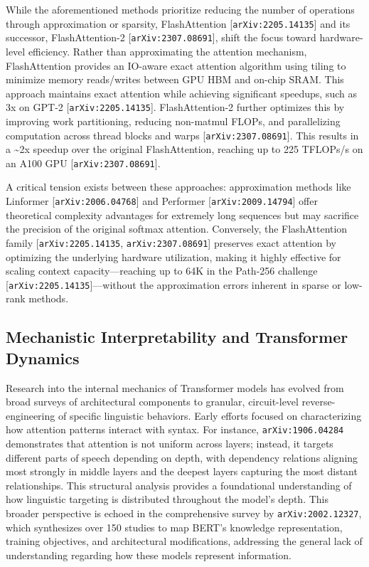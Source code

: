 \documentclass[11pt]{article}
\begin{document}
While the aforementioned methods prioritize reducing the number of operations through approximation or sparsity, FlashAttention [\texttt{arXiv:2205.14135}] and its successor, FlashAttention-2 [\texttt{arXiv:2307.08691}], shift the focus toward hardware-level efficiency. Rather than approximating the attention mechanism, FlashAttention provides an IO-aware exact attention algorithm using tiling to minimize memory reads/writes between GPU HBM and on-chip SRAM. This approach maintains exact attention while achieving significant speedups, such as 3x on GPT-2 [\texttt{arXiv:2205.14135}]. FlashAttention-2 further optimizes this by improving work partitioning, reducing non-matmul FLOPs, and parallelizing computation across thread blocks and warps [\texttt{arXiv:2307.08691}]. This results in a \textasciitilde{}2x speedup over the original FlashAttention, reaching up to 225 TFLOPs/s on an A100 GPU [\texttt{arXiv:2307.08691}].

A critical tension exists between these approaches: approximation methods like Linformer [\texttt{arXiv:2006.04768}] and Performer [\texttt{arXiv:2009.14794}] offer theoretical complexity advantages for extremely long sequences but may sacrifice the precision of the original softmax attention. Conversely, the FlashAttention family [\texttt{arXiv:2205.14135}, \texttt{arXiv:2307.08691}] preserves exact attention by optimizing the underlying hardware utilization, making it highly effective for scaling context capacity—reaching up to 64K in the Path-256 challenge [\texttt{arXiv:2205.14135}]—without the approximation errors inherent in sparse or low-rank methods.

\subsection{Mechanistic Interpretability and Transformer Dynamics}

Research into the internal mechanics of Transformer models has evolved from broad surveys of architectural components to granular, circuit-level reverse-engineering of specific linguistic behaviors. Early efforts focused on characterizing how attention patterns interact with syntax. For instance, \texttt{arXiv:1906.04284} demonstrates that attention is not uniform across layers; instead, it targets different parts of speech depending on depth, with dependency relations aligning most strongly in middle layers and the deepest layers capturing the most distant relationships. This structural analysis provides a foundational understanding of how linguistic targeting is distributed throughout the model's depth. This broader perspective is echoed in the comprehensive survey by \texttt{arXiv:2002.12327}, which synthesizes over 150 studies to map BERT's knowledge representation, training objectives, and architectural modifications, addressing the general lack of understanding regarding how these models represent information.
\end{document}
